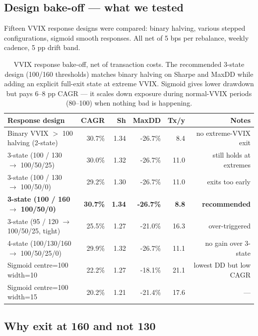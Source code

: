 \documentclass[11pt,a4paper]{article}
\begin{document}
\subsection{Design bake-off --- what we tested}

Fifteen VVIX response designs were compared: binary halving, various stepped configurations, sigmoid smooth responses. All net of 5 bps per rebalance, weekly cadence, 5 pp drift band.

\begin{table}[H]
\centering
\small
\begin{tabular}{lrrrrr}
\toprule
\textbf{Response design} & \textbf{CAGR} & \textbf{Sh} & \textbf{MaxDD} & \textbf{Tx/y} & \textbf{Notes} \\
\midrule
Binary VVIX $>$ 100 halving (2-state)          & 30.7\% & 1.34 & -26.7\% & 8.4 & no extreme-VVIX exit \\
3-state (100 / 130 $\to$ 100/50/25)            & 30.0\% & 1.32 & -26.7\% & 11.0 & still holds at extremes \\
3-state (100 / 130 $\to$ 100/50/0)             & 29.2\% & 1.30 & -26.7\% & 11.0 & exits too early \\
\rowcolor{green!10} \textbf{3-state (100 / 160 $\to$ 100/50/0)} & \textbf{30.7\%} & \textbf{1.34} & \textbf{-26.7\%} & \textbf{8.8} & \textbf{recommended} \\
3-state (95 / 120 $\to$ 100/50/25, tight)      & 25.5\% & 1.27 & -21.0\% & 16.3 & over-triggered \\
4-state (100/130/160 $\to$ 100/50/25/0)        & 29.9\% & 1.32 & -26.7\% & 11.1 & no gain over 3-state \\
Sigmoid centre=100 width=10                     & 22.2\% & 1.27 & -18.1\% & 21.1 & lowest DD but low CAGR \\
Sigmoid centre=100 width=15                     & 20.2\% & 1.21 & -21.4\% & 17.6 & --- \\
\bottomrule
\end{tabular}
\caption{VVIX response bake-off, net of transaction costs. The recommended 3-state design (100/160 thresholds) matches binary halving on Sharpe and MaxDD while adding an explicit full-exit state at extreme VVIX. Sigmoid gives lower drawdown but pays 6--8 pp CAGR --- it scales down exposure during normal-VVIX periods (80--100) when nothing bad is happening.}
\end{table}

\subsection{Why exit at 160 and not 130}
\end{document}
